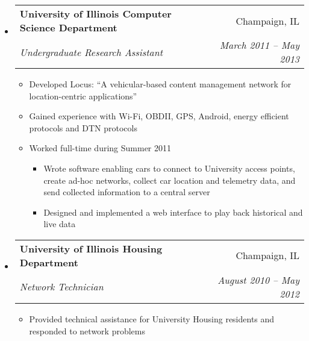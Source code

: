 \documentclass[letterpaper,11pt]{article}
\makeatletter
\newcommand{\resitem}[1]{\item #1 \vspace{-2pt}}
\newcommand{\resheading}[1]{{\large \colorbox{mygrey}{\begin{minipage}{\textwidth}{\textbf{#1 \vphantom{p\^{E}}}}\end{minipage}}}}
\newcommand{\ressubheading}[4]{
\begin{tabular*}{7.0in}{l@{\extracolsep{\fill}}r}
		\textbf{#1} & #2 \\
		\textit{#3} & \textit{#4} \\
\end{tabular*}\vspace{-6pt}}
\newcommand{\resoneheadingit}[2]{
\begin{tabular*}{7.0in}{l@{\extracolsep{\fill}}r}
		\textbf{#1} & \textit{#2} \\
\end{tabular*}\vspace{-6pt}}
\makeatother
\begin{document}
\begin{itemize}
\item
	\ressubheading{University of Illinois Computer Science Department}{Champaign, IL}{Undergraduate Research Assistant}{March 2011 -- May 2013}
	\begin{itemize}
		\resitem{Developed Locus: ``A vehicular-based content management network for location-centric applications''}
		\resitem{Gained experience with Wi-Fi, OBDII, GPS, Android, energy efficient protocols and DTN protocols}
		\resitem{Worked full-time during Summer 2011}
		\begin{itemize}
			\resitem{Wrote software enabling cars to connect to University access points, create ad-hoc networks,
			 collect car location and telemetry data, and send collected information to a central server}
			\resitem{Designed and implemented a web interface to play back historical and live data}
		\end{itemize}
	\end{itemize}
\item
	\ressubheading{University of Illinois Housing Department}{Champaign, IL}{Network Technician}{August 2010 -- May 2012}
	\begin{itemize}
		\resitem{Provided technical assistance for University Housing residents and responded to network problems}
	\end{itemize}

\end{itemize}
%
\end{document}
